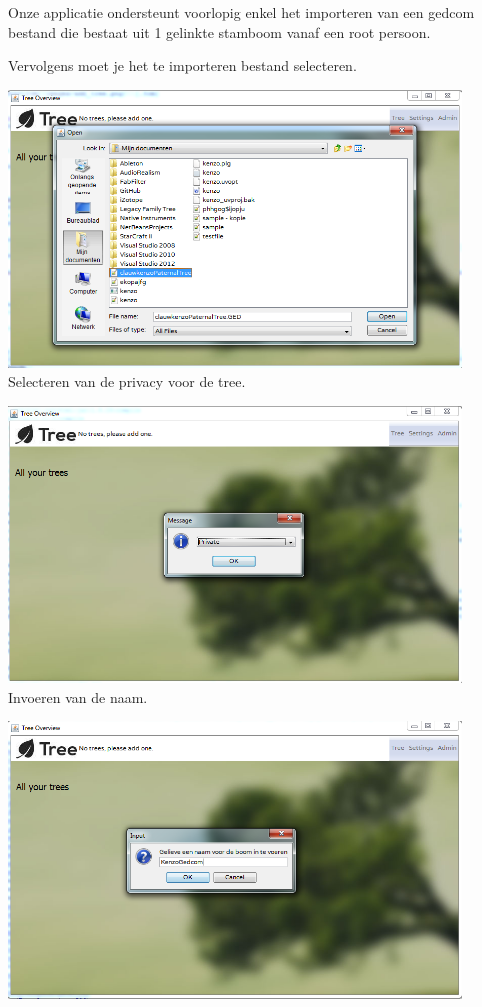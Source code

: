 \documentclass[pdftex,a4paper,12pt,twoside]{report}
\begin{document}
Onze applicatie ondersteunt voorlopig enkel het importeren van een gedcom bestand die bestaat uit 1 gelinkte stamboom vanaf een root persoon. 

Vervolgens moet je het te importeren bestand selecteren.

\includegraphics[width=12cm]{images/gedcom_select.png}\\[.5cm]

Selecteren van de privacy voor de tree.

\includegraphics[width=12cm]{images/gedcom_privacy.png}\\[.5cm]

Invoeren van de naam.

\includegraphics[width=12cm]{images/gedcom_naam.png}\\[.5cm]
\end{document}
